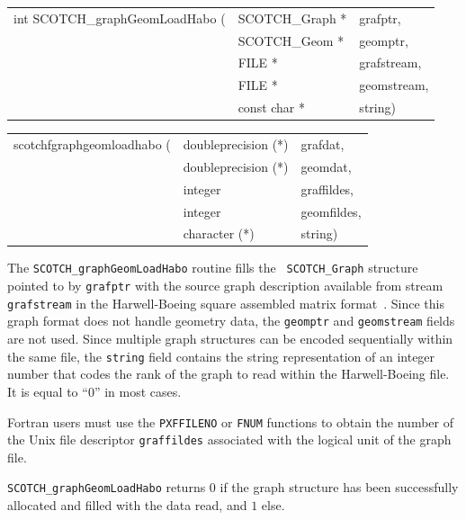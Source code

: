 \begin{itemize}
\progsyn

{\tt\begin{tabular}{l@{}ll}
int SCOTCH\_graphGeomLoadHabo ( & SCOTCH\_Graph * & grafptr,    \\
                                & SCOTCH\_Geom *  & geomptr,    \\
                                & FILE *          & grafstream, \\
                                & FILE *          & geomstream, \\
                                & const char *    & string)
\end{tabular}}

{\tt\begin{tabular}{l@{}ll}
scotchfgraphgeomloadhabo ( & doubleprecision (*) & grafdat,    \\
                           & doubleprecision (*) & geomdat,    \\
                           & integer             & graffildes, \\
                           & integer             & geomfildes, \\
                           & character (*)       & string)
\end{tabular}}

\progdes

The {\tt SCOTCH\_graphGeomLoadHabo} routine fills the {\tt
SCOTCH\_\lbt Graph} structure pointed to by {\tt grafptr} with the
source graph description available from stream {\tt graf\lbt stream}
in the Harwell-Boeing square assembled matrix format~\cite{dugrle92}.
Since this graph format does not handle geometry data, the
{\tt geomptr} and {\tt geom\lbt stream} fields are not used. Since
multiple graph structures can be encoded sequentially within the same
file, the {\tt string} field contains the string representation of an
integer number that codes the rank of the graph to read within the
Harwell-Boeing file. It is equal to ``0'' in most cases.

Fortran users must use the {\tt PXFFILENO} or {\tt FNUM} functions to
obtain the number of the Unix file descriptor {\tt graf\lbt fildes}
associated with the logical unit of the graph file.

\progret

{\tt SCOTCH\_graphGeomLoadHabo} returns $0$ if the graph structure has
been successfully allocated and filled with the data read, and $1$ else.
\end{itemize}

